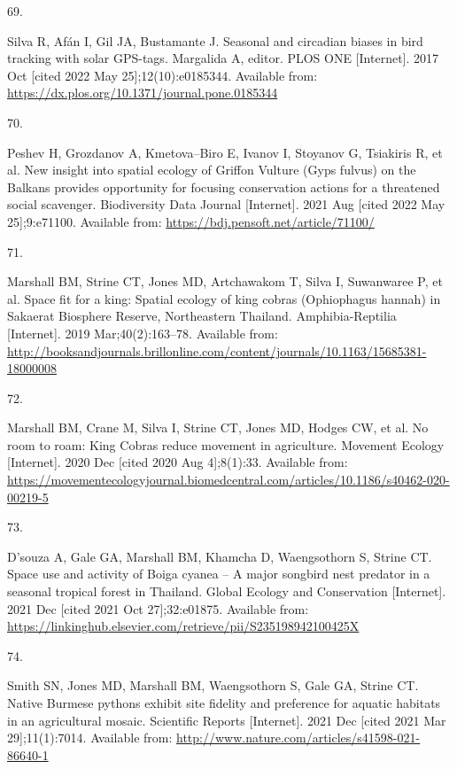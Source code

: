 \documentclass[10pt,a4paper]{article}
\newlength{\cslhangindent}
\newlength{\csllabelwidth}
\newlength{\cslentryspacingunit} %
\newenvironment{CSLReferences}[2] %
 {%
  \setlength{\parindent}{0pt}
  \ifodd #1
  \let\oldpar\par
  \def\par{\hangindent=\cslhangindent\oldpar}
  \fi
  \setlength{\parskip}{#2\cslentryspacingunit}
 }%
 {}
\newcommand{\CSLLeftMargin}[1]{\parbox[t]{\csllabelwidth}{#1}}
\newcommand{\CSLRightInline}[1]{\parbox[t]{\linewidth - \csllabelwidth}{#1}\break}
\begin{document}
\begin{CSLReferences}{0}{0}
\leavevmode{}%
\CSLLeftMargin{69. }
\CSLRightInline{Silva R, Afán I, Gil JA, Bustamante J. Seasonal and circadian biases in bird tracking with solar {GPS}-tags. Margalida A, editor. PLOS ONE {[}Internet{]}. 2017 Oct {[}cited 2022 May 25{]};12(10):e0185344. Available from: \url{https://dx.plos.org/10.1371/journal.pone.0185344}}

\leavevmode{}%
\CSLLeftMargin{70. }
\CSLRightInline{Peshev H, Grozdanov A, Kmetova--Biro E, Ivanov I, Stoyanov G, Tsiakiris R, et al. New insight into spatial ecology of {Griffon} {Vulture} ({Gyps} fulvus) on the {Balkans} provides opportunity for focusing conservation actions for a threatened social scavenger. Biodiversity Data Journal {[}Internet{]}. 2021 Aug {[}cited 2022 May 25{]};9:e71100. Available from: \url{https://bdj.pensoft.net/article/71100/}}

\leavevmode{}%
\CSLLeftMargin{71. }
\CSLRightInline{Marshall BM, Strine CT, Jones MD, Artchawakom T, Silva I, Suwanwaree P, et al. Space fit for a king: Spatial ecology of king cobras ({Ophiophagus} hannah) in {Sakaerat} {Biosphere} {Reserve}, {Northeastern} {Thailand}. Amphibia-Reptilia {[}Internet{]}. 2019 Mar;40(2):163--78. Available from: \url{http://booksandjournals.brillonline.com/content/journals/10.1163/15685381-18000008}}

\leavevmode{}%
\CSLLeftMargin{72. }
\CSLRightInline{Marshall BM, Crane M, Silva I, Strine CT, Jones MD, Hodges CW, et al. No room to roam: {King} {Cobras} reduce movement in agriculture. Movement Ecology {[}Internet{]}. 2020 Dec {[}cited 2020 Aug 4{]};8(1):33. Available from: \url{https://movementecologyjournal.biomedcentral.com/articles/10.1186/s40462-020-00219-5}}

\leavevmode{}%
\CSLLeftMargin{73. }
\CSLRightInline{D'souza A, Gale GA, Marshall BM, Khamcha D, Waengsothorn S, Strine CT. Space use and activity of {Boiga} cyanea -- {A} major songbird nest predator in a seasonal tropical forest in {Thailand}. Global Ecology and Conservation {[}Internet{]}. 2021 Dec {[}cited 2021 Oct 27{]};32:e01875. Available from: \url{https://linkinghub.elsevier.com/retrieve/pii/S235198942100425X}}

\leavevmode{}%
\CSLLeftMargin{74. }
\CSLRightInline{Smith SN, Jones MD, Marshall BM, Waengsothorn S, Gale GA, Strine CT. Native {Burmese} pythons exhibit site fidelity and preference for aquatic habitats in an agricultural mosaic. Scientific Reports {[}Internet{]}. 2021 Dec {[}cited 2021 Mar 29{]};11(1):7014. Available from: \url{http://www.nature.com/articles/s41598-021-86640-1}}


\end{CSLReferences}
\end{document}
